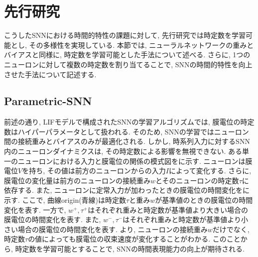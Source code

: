 \section{先行研究}
こうしたSNNにおける時間的特性の課題に対して, 先行研究では時定数を学習可能とし, その多様性を実現している\cite{dhsnn, yin2020effective, paramsnn}.
本節では, ニューラルネットワークの重みとバイアスと同様に, 時定数を学習可能とした手法について述べる.
さらに, 1つのニューロンに対して複数の時定数を割り当てることで, SNNの時間的特性を向上させた手法について記述する.

\subsection{Parametric-SNN}
前述の通り, LIFモデルで構成されたSNNの学習アルゴリズムでは, 膜電位の時定数はハイパーパラメータとして扱われる.
そのため, SNNの学習ではニューロン間の接続重みとバイアスのみが最適化される.
しかし, 時系列入力に対するSNN内のニューロンダイナミクスは, その時定数による影響を無視できない.
ある単一のニューロンにおける入力と膜電位の関係の模式図をに示す.
ニューロンは膜電位$V$を持ち, その値は前方のニューロンからの入力$I$によって変化する.
さらに, 膜電位の変化量は前方のニューロンの接続重み$w$とそのニューロンの時定数$\tau$に依存する.
また, ニューロンに定常入力が加わったときの膜電位の時間変化をに示す.
ここで, 曲線origin(青線)は時定数$\tau$と重み$w$が基準値のときの膜電位の時間変化を表す.
一方で, $w^+, \tau^+$はそれぞれ重みと時定数が基準値より大きい場合の膜電位の時間変化を表す.
また, $w^-, \tau^-$はそれぞれ重みと時定数が基準値より小さい場合の膜電位の時間変化を表す.
より, ニューロンの接続重み$w$だけでなく, 時定数$\tau$の値によっても膜電位の収束速度が変化することがわかる.
このことから, 時定数を学習可能とすることで, SNNの時間表現能力の向上が期待される.
